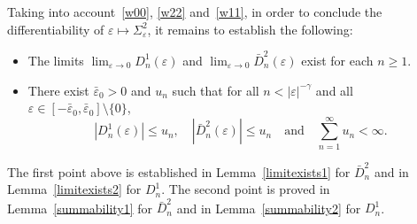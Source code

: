 \documentclass[12pt,reqno,a4paper]{article}
\newcommand{\ve}{\varepsilon}
\begin{document}
Taking into account~\eqref{w00}, \eqref{w22} and~\eqref{w11}, in order to conclude the differentiability of $\varepsilon \mapsto \Sigma^2_\ve$, it remains to establish the following:
\begin{itemize}
	\item The limits $\lim_{\ve \to 0} D_n^1(\ve)$ and $\lim_{\ve \to 0}\bar D_n^2(\varepsilon)$ exist for each $n \ge 1$.
	\item There exist $\bar{\ve}_0 > 0$ and $u_n$ such that 
	for all $n < |\ve|^{-\gamma}$ and all $\ve \in [-\bar{\ve}_0, \bar{\ve}_0]\setminus \{0\}$,
	$$
	|D_n^1(\ve)| \le u_n, \quad | \bar D_n^2(\ve)|\le u_n \quad \text{and} \quad 
	\sum_{n=1}^\infty u_n < \infty.
	$$
\end{itemize}
The first point above is established in Lemma~\ref{limitexists1} for $\bar D_n^2$ and in Lemma~\ref{limitexists2} for $D_n^1$. The second point is proved in Lemma~\ref{summability1} for $\bar D_n^2$ and in Lemma~\ref{summability2} for $D_n^1$.
\end{document}
